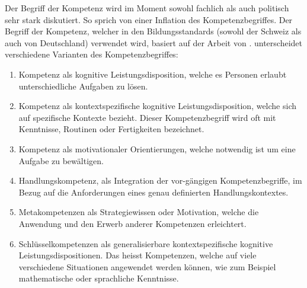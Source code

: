 Der Begriff der Kompetenz wird im Moment sowohl fachlich als auch politisch sehr stark diskutiert. So sprich \citet{Weinert2001b} von einer Inflation des Kompetenzbegriffes.
Der Begriff der Kompetenz, welcher in den Bildungsstandards (sowohl der Schweiz als auch von Deutschland) verwendet wird, basiert auf der Arbeit von \citet{Klieme2004}.
\citet{Klieme2004} unterscheidet verschiedene Varianten des Kompetenzbegriffes: 
\begin{enumerate}
\item Kompetenz als kognitive Leistungsdisposition, welche es Personen erlaubt unterschiedliche Aufgaben zu lösen.
\item Kompetenz als kontextspezifische kognitive Leistungsdisposition, welche sich auf spezifische Kontexte bezieht. Dieser Kompetenzbegriff wird oft mit Kenntnisse, Routinen oder Fertigkeiten bezeichnet.
\item Kompetenz als motivationaler Orientierungen, welche notwendig ist um eine Aufgabe zu bewältigen.
\item Handlungskompetenz, als Integration der vor-gängigen Kompetenzbegriffe, im Bezug auf die Anforderungen eines genau definierten Handlungskontextes.
\item Metakompetenzen als Strategiewissen oder Motivation, welche die Anwendung und den Erwerb anderer Kompetenzen erleichtert.
\item Schlüsselkompetenzen als generalisierbare kontextspezifische kognitive Leistungsdispositionen. Das heisst Kompetenzen, welche auf viele verschiedene Situationen angewendet werden können, wie zum Beispiel mathematische oder sprachliche Kenntnisse.
\end{enumerate}





